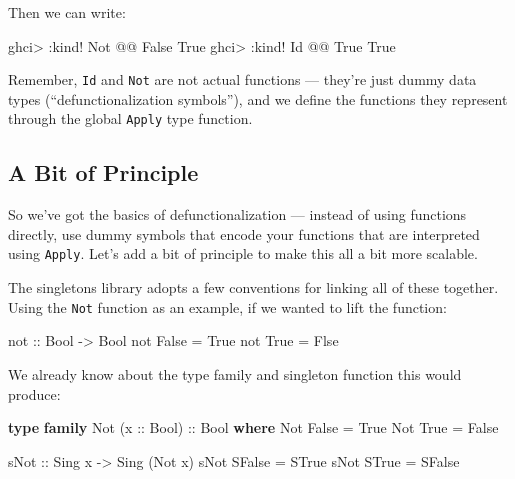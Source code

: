 \documentclass[]{article}
\newenvironment{Shaded}{}{}
\newcommand{\DataTypeTok}[1]{\textcolor[rgb]{0.56,0.13,0.00}{#1}}
\newcommand{\FunctionTok}[1]{\textcolor[rgb]{0.02,0.16,0.49}{#1}}
\newcommand{\KeywordTok}[1]{\textcolor[rgb]{0.00,0.44,0.13}{\textbf{#1}}}
\newcommand{\NormalTok}[1]{#1}
\newcommand{\OperatorTok}[1]{\textcolor[rgb]{0.40,0.40,0.40}{#1}}
\newcommand{\OtherTok}[1]{\textcolor[rgb]{0.00,0.44,0.13}{#1}}
\begin{document}
Then we can write:

\begin{Shaded}
\begin{Highlighting}[]
\NormalTok{ghci}\OperatorTok{\textgreater{}} \OperatorTok{:}\NormalTok{kind}\OperatorTok{!} \DataTypeTok{Not} \OperatorTok{@@} \DataTypeTok{\textquotesingle{}False}
\DataTypeTok{\textquotesingle{}True}
\NormalTok{ghci}\OperatorTok{\textgreater{}} \OperatorTok{:}\NormalTok{kind}\OperatorTok{!} \DataTypeTok{Id} \OperatorTok{@@} \DataTypeTok{\textquotesingle{}True}
\DataTypeTok{\textquotesingle{}True}
\end{Highlighting}
\end{Shaded}

Remember, \texttt{Id} and \texttt{Not} are not actual functions --- they're just
dummy data types (``defunctionalization symbols''), and we define the functions
they represent through the global \texttt{Apply} type function.

\subsection{A Bit of Principle}\label{a-bit-of-principle}

So we've got the basics of defunctionalization --- instead of using functions
directly, use dummy symbols that encode your functions that are interpreted
using \texttt{Apply}. Let's add a bit of principle to make this all a bit more
scalable.

The singletons library adopts a few conventions for linking all of these
together. Using the \texttt{Not} function as an example, if we wanted to lift
the function:

\begin{Shaded}
\begin{Highlighting}[]
\FunctionTok{not}\OtherTok{ ::} \DataTypeTok{Bool} \OtherTok{{-}\textgreater{}} \DataTypeTok{Bool}
\FunctionTok{not} \DataTypeTok{False} \OtherTok{=} \DataTypeTok{True}
\FunctionTok{not} \DataTypeTok{True}  \OtherTok{=} \DataTypeTok{Flse}
\end{Highlighting}
\end{Shaded}

We already know about the type family and singleton function this would produce:

\begin{Shaded}
\begin{Highlighting}[]
\KeywordTok{type} \KeywordTok{family} \DataTypeTok{Not}\NormalTok{ (}\OtherTok{x ::} \DataTypeTok{Bool}\NormalTok{)}\OtherTok{ ::} \DataTypeTok{Bool} \KeywordTok{where}
    \DataTypeTok{Not} \DataTypeTok{\textquotesingle{}False} \OtherTok{=} \DataTypeTok{\textquotesingle{}True}
    \DataTypeTok{Not} \DataTypeTok{\textquotesingle{}True}  \OtherTok{=} \DataTypeTok{\textquotesingle{}False}

\OtherTok{sNot ::} \DataTypeTok{Sing}\NormalTok{ x }\OtherTok{{-}\textgreater{}} \DataTypeTok{Sing}\NormalTok{ (}\DataTypeTok{Not}\NormalTok{ x)}
\NormalTok{sNot }\DataTypeTok{SFalse} \OtherTok{=} \DataTypeTok{STrue}
\NormalTok{sNot }\DataTypeTok{STrue}  \OtherTok{=} \DataTypeTok{SFalse}
\end{Highlighting}
\end{Shaded}
\end{document}
